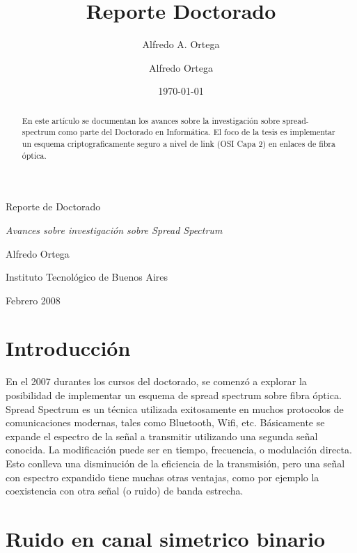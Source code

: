 \documentclass[a4paper,12pt]{article}
\title{Reporte Doctorado}
\author{Alfredo A. Ortega }
\date{\today}
\begin{document}
 
\begin{titlepage}
\null\vfill
\begin{center}\Large
Reporte de Doctorado
\par
\small \textit{Avances sobre investigación sobre Spread Spectrum} \par
\vskip1cm
\small Alfredo Ortega\par
Instituto Tecnológico de Buenos Aires\par
\vskip1cm
Febrero 2008
\end{center}\vfill

\begin{abstract}
En este artículo se documentan los avances sobre la investigación sobre spread-spectrum como parte del Doctorado en Informática.
El foco de la tesis es implementar un esquema criptograficamente seguro a nivel de link (OSI Capa 2) en enlaces de fibra óptica.
\end{abstract}

\end{titlepage}

\author{Alfredo Ortega}

\tableofcontents

\section{Introducción}
En el 2007 durantes los cursos del doctorado, se comenzó a explorar la posibilidad de implementar un esquema de spread spectrum sobre fibra óptica.
Spread Spectrum es un técnica utilizada exitosamente en muchos protocolos de comunicaciones modernas, tales como Bluetooth, Wifi, etc.
Básicamente se expande el espectro de la señal a transmitir utilizando una segunda señal conocida. 
La modificación puede ser en tiempo, frecuencia, o modulación directa. Esto conlleva una disminución de la eficiencia de la transmisión, pero una señal con espectro expandido tiene muchas otras ventajas, como por ejemplo la coexistencia con otra señal (o ruido) de banda estrecha.

\section{Ruido en canal simetrico binario}
\end{document}
